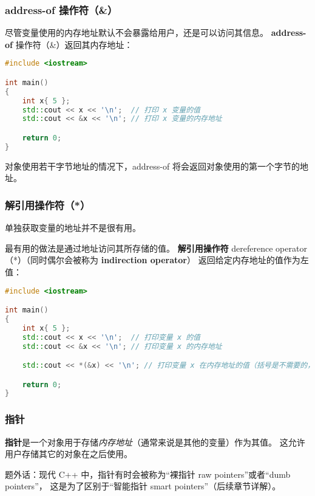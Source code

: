 \documentclass[../../LearnCpp.tex]{subfiles}
\begin{document}

\subsubsection*{address-of 操作符（\&）}

尽管变量使用的内存地址默认不会暴露给用户，还是可以访问其信息。
\textbf{address-of} 操作符（\&）返回其内存地址：

\begin{lstlisting}[language=C++]
#include <iostream>

int main()
{
    int x{ 5 };
    std::cout << x << '\n';  // 打印 x 变量的值
    std::cout << &x << '\n'; // 打印 x 变量的内存地址

    return 0;
}
\end{lstlisting}

对象使用若干字节地址的情况下，address-of 将会返回对象使用的第一个字节的地址。

\subsubsection*{解引用操作符（*）}

单独获取变量的地址并不是很有用。

最有用的做法是通过地址访问其所存储的值。
\textbf{解引用操作符} dereference operator（*）（同时偶尔会被称为 \textbf{indirection operator}）
返回给定内存地址的值作为左值：

\begin{lstlisting}[language=C++]
#include <iostream>

int main()
{
    int x{ 5 };
    std::cout << x << '\n';  // 打印变量 x 的值
    std::cout << &x << '\n'; // 打印变量 x 的内存地址

    std::cout << *(&x) << '\n'; // 打印变量 x 在内存地址的值（括号是不需要的，仅方便阅读）

    return 0;
}
\end{lstlisting}

\subsubsection*{指针}

\textbf{指针}是一个对象用于存储\textit{内存地址}（通常来说是其他的变量）作为其值。
这允许用户存储其它的对象在之后使用。

题外话：现代 C++ 中，指针有时会被称为“裸指针 raw pointers”或者“dumb pointers”，
这是为了区别于“智能指针 smart pointers”（后续章节详解）。
\end{document}
